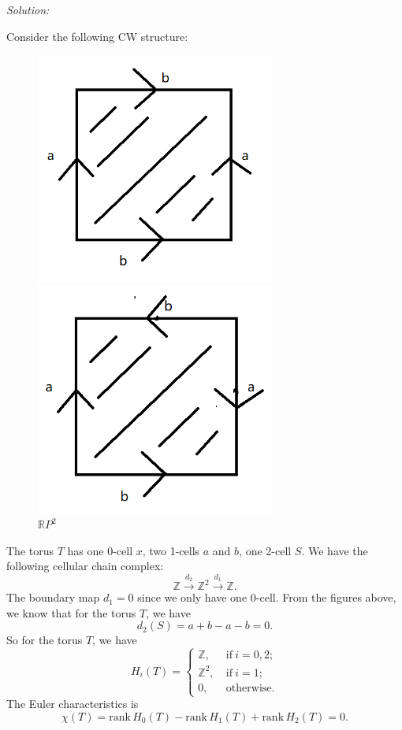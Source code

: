 \documentclass[a4paper, 12pt]{article}
\newenvironment{solution}
    {\textit{Solution:}}
    {}
\newcommand{\rank}{\text{rank}\,}
\begin{document}
\begin{solution}
\begin{enumerate}[(1)]
Consider the following CW structure:
\begin{figure}[h]
    \centering
    \begin{minipage}[b]{0.4\textwidth}
      \includegraphics[width=0.7\textwidth]{Pictures/HW1-1-1.png}
      \caption{\(T\)}
    \end{minipage}
    \hfill
    \begin{minipage}[b]{0.4\textwidth}
      \includegraphics[width=0.7\textwidth]{Pictures/HW1-1-2.png}
      \caption{\(\mathbb{R}P^2\)}
    \end{minipage}
  \end{figure}
The torus \(T\) has one 0-cell \(x\), two 1-cells \(a\) and \(b\), one 2-cell \(S\). We have the following cellular chain complex:
\[\mathbb{Z}\xrightarrow{d_2}\mathbb{Z}^2\xrightarrow{d_1}\mathbb{Z}.\]
The boundary map \(d_1=0\) since we only have one 0-cell. From the figures above, we know that for the torus \(T\), we have 
\[d_2(S)=a+b-a-b=0.\]
So for the torus \(T\), we have 
\[H_i(T)=\begin{cases}
    \mathbb{Z},&\ \text{if}\ i=0,2;\\ 
    \mathbb{Z}^2,&\ \text{if}\ i=1;\\ 
    0,&\ \text{otherwise}.
\end{cases}\]
The Euler characteristics is 
\[\chi(T)=\rank H_0(T)-\rank H_1(T)+\rank H_2(T)=0.\]


\end{enumerate}
\end{solution}
\end{document}
